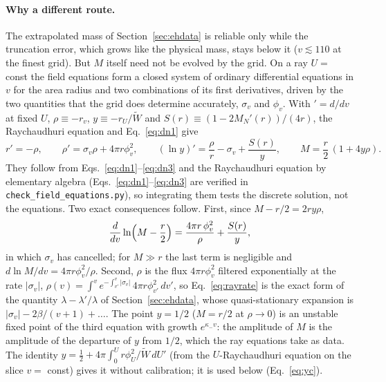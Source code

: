 \documentclass[11pt]{article}
\begin{document}
\paragraph{Why a different route.} The extrapolated mass of Section~\ref{sec:ehdata} is reliable only while the truncation error, which grows like the physical mass, stays below it ($v\lesssim110$ at the finest grid). But $M$ itself need not be evolved by the grid. On a ray $U=$ const the field equations form a closed system of ordinary differential equations in $v$ for the area radius and two combinations of its first derivatives, driven by the two quantities that the grid does determine accurately, $\sigma_v$ and $\phi_v$. With $'=d/dv$ at fixed $U$, $\rho\equiv-r_v$, $y\equiv-r_U/\tilde W$ and $S(r)\equiv(1-2M_N'(r))/(4r)$, the Raychaudhuri equation and Eq.~\eqref{eq:dn1} give
\begin{equation}
r'=-\rho,\qquad \rho'=\sigma_v\rho+4\pi r\phi_v^2,\qquad (\ln y)'=\frac{\rho}{r}-\sigma_v+\frac{S(r)}{y},\qquad M=\frac r2\,(1+4y\rho).
\label{eq:ray}
\end{equation}
They follow from Eqs.~\eqref{eq:dn1}--\eqref{eq:dn3} and the Raychaudhuri equation by elementary algebra (Eqs.~\eqref{eq:dn1}--\eqref{eq:dn3} are verified in \texttt{check\_field\_equations.py}), so integrating them tests the discrete solution, not the equations. Two exact consequences follow. First, since $M-r/2=2ry\rho$,
\begin{equation}
\frac{d}{dv}\ln\Bigl(M-\frac r2\Bigr)=\frac{4\pi r\,\phi_v^2}{\rho}+\frac{S(r)}{y},
\label{eq:rayrate}
\end{equation}
in which $\sigma_v$ has cancelled; for $M\gg r$ the last term is negligible and $d\ln M/dv=4\pi r\phi_v^2/\rho$. Second, $\rho$ is the flux $4\pi r\phi_v^2$ filtered exponentially at the rate $|\sigma_v|$, $\rho(v)=\int^v e^{-\int_{v'}^v|\sigma_v|}\,4\pi r\phi_{v'}^2\,dv'$, so Eq.~\eqref{eq:rayrate} is the exact form of the quantity $\lambda-\lambda'/\lambda$ of Section~\ref{sec:ehdata}, whose quasi-stationary expansion is $|\sigma_v|-2\beta/(v+1)+\dots$. The point $y=1/2$ ($M=r/2$ at $\rho\to0$) is an unstable fixed point of the third equation with growth $e^{\kappa_-v}$: the amplitude of $M$ is the amplitude of the departure of $y$ from $1/2$, which the ray equations take as data. The identity $y=\tfrac12+4\pi\int_0^U r\phi_U^2/\tilde W\,dU'$ (from the $U$-Raychaudhuri equation on the slice $v=$ const) gives it without calibration; it is used below (Eq.~\eqref{eq:yc}).
\end{document}
